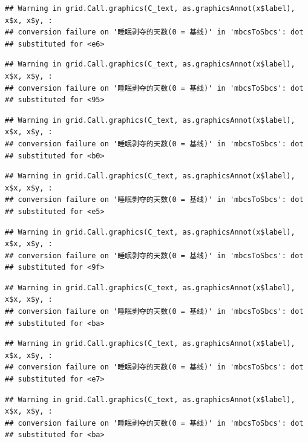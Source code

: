 \documentclass[
]{book}
\begin{document}
\begin{verbatim}
## Warning in grid.Call.graphics(C_text, as.graphicsAnnot(x$label), x$x, x$y, :
## conversion failure on '睡眠剥夺的天数(0 = 基线)' in 'mbcsToSbcs': dot
## substituted for <e6>
\end{verbatim}

\begin{verbatim}
## Warning in grid.Call.graphics(C_text, as.graphicsAnnot(x$label), x$x, x$y, :
## conversion failure on '睡眠剥夺的天数(0 = 基线)' in 'mbcsToSbcs': dot
## substituted for <95>
\end{verbatim}

\begin{verbatim}
## Warning in grid.Call.graphics(C_text, as.graphicsAnnot(x$label), x$x, x$y, :
## conversion failure on '睡眠剥夺的天数(0 = 基线)' in 'mbcsToSbcs': dot
## substituted for <b0>
\end{verbatim}

\begin{verbatim}
## Warning in grid.Call.graphics(C_text, as.graphicsAnnot(x$label), x$x, x$y, :
## conversion failure on '睡眠剥夺的天数(0 = 基线)' in 'mbcsToSbcs': dot
## substituted for <e5>
\end{verbatim}

\begin{verbatim}
## Warning in grid.Call.graphics(C_text, as.graphicsAnnot(x$label), x$x, x$y, :
## conversion failure on '睡眠剥夺的天数(0 = 基线)' in 'mbcsToSbcs': dot
## substituted for <9f>
\end{verbatim}

\begin{verbatim}
## Warning in grid.Call.graphics(C_text, as.graphicsAnnot(x$label), x$x, x$y, :
## conversion failure on '睡眠剥夺的天数(0 = 基线)' in 'mbcsToSbcs': dot
## substituted for <ba>
\end{verbatim}

\begin{verbatim}
## Warning in grid.Call.graphics(C_text, as.graphicsAnnot(x$label), x$x, x$y, :
## conversion failure on '睡眠剥夺的天数(0 = 基线)' in 'mbcsToSbcs': dot
## substituted for <e7>
\end{verbatim}

\begin{verbatim}
## Warning in grid.Call.graphics(C_text, as.graphicsAnnot(x$label), x$x, x$y, :
## conversion failure on '睡眠剥夺的天数(0 = 基线)' in 'mbcsToSbcs': dot
## substituted for <ba>
\end{verbatim}
\end{document}

